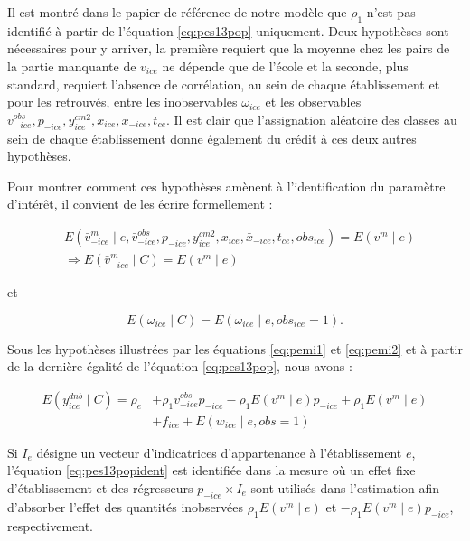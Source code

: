 \documentclass[
]{book}
\begin{document}
Il est montré dans le papier de référence de notre modèle que \(\rho_1\) n'est pas identifié à partir de l'équation \eqref{eq:pes13pop} uniquement. Deux hypothèses sont nécessaires pour y arriver, la première requiert que la moyenne chez les pairs de la partie manquante de \(v_{ice}\) ne dépende que de l'école et la seconde, plus standard, requiert l'absence de corrélation, au sein de chaque établissement et pour les retrouvés, entre les inobservables \(\omega_{ice}\) et les observables \(\bar{v}^{obs}_{-ice}, p_{-ice}, y^{cm2}_{ice}, x_{ice}, \bar{x}_{-ice}, t_{ce}\). Il est clair que l'assignation aléatoire des classes au sein de chaque établissement donne également du crédit à ces deux autres hypothèses.

\quad Pour montrer comment ces hypothèses amènent à l'identification du paramètre d'intérêt, il convient de les écrire formellement :

\begin{equation}
\label{eq:pemi1}
\begin{aligned}
&E(\bar{v}^m_{-ice} \mid e, \bar{v}^{obs}_{-ice}, p_{-ice}, y^{cm2}_{ice}, x_{ice}, \bar{x}_{-ice}, t_{ce}, obs_{ice}) = 
E(v^m \mid e) \\
&\Rightarrow
E(\bar{v}^m_{-ice} \mid C) = E(v^m \mid e)
\end{aligned}
\end{equation}

et

\begin{equation}
\label{eq:pemi2}
E(\omega_{ice} \mid C) = E(\omega_{ice} \mid e, obs_{ice} = 1).
\end{equation}

\quad Sous les hypothèses illustrées par les équations \eqref{eq:pemi1} et \eqref{eq:pemi2} et à partir de la dernière égalité de l'équation \eqref{eq:pes13pop}, nous avons :

\begin{equation}
\label{eq:pes13popident}
\begin{aligned}
E(y^{dnb}_{ice} \mid C) = 
\rho_e &+ \rho_1 \bar{v}^{obs}_{-ice} p_{-ice} - \rho_1 E(v^m \mid e) p_{-ice} + \rho_1 E(v^m \mid e) \\
&+ f_{ice} + 
E(w_{ice} \mid e, obs = 1)
\end{aligned}
\end{equation}

Si \(I_e\) désigne un vecteur d'indicatrices d'appartenance à l'établissement \(e\), l'équation \eqref{eq:pes13popident} est identifiée dans la mesure où un effet fixe d'établissement et des régresseurs \(p_{-ice} \times I_e\) sont utilisés dans l'estimation afin d'absorber l'effet des quantités inobservées \(\rho_1 E(v^m \mid e)\) et \(- \rho_1 E(v^m \mid e) p_{-ice}\), respectivement.
\end{document}
